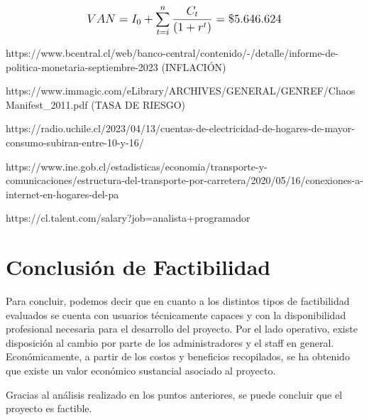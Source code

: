 \[
\mathlarger{
	{VAN} = I_0 + \sum\limits_{t=i}^{n}\frac{C_t}{\left(1+r^t\right)} = \$5.646.624
}
\]

https://www.bcentral.cl/web/banco-central/contenido/-/detalle/informe-de-politica-monetaria-septiembre-2023 (INFLACIÓN)

https://www.immagic.com/eLibrary/ARCHIVES/GENERAL/GENREF/ChaosManifest\_2011.pdf (TASA DE RIESGO)

https://radio.uchile.cl/2023/04/13/cuentas-de-electricidad-de-hogares-de-mayor-consumo-subiran-entre-10-y-16/

https://www.ine.gob.cl/estadisticas/economia/transporte-y-comunicaciones/estructura-del-transporte-por-carretera/2020/05/16/conexiones-a-internet-en-hogares-del-pa%

https://cl.talent.com/salary?job=analista+programador

\section{Conclusión de Factibilidad}
Para concluir, podemos decir que en cuanto a los distintos tipos de factibilidad evaluados se cuenta con usuarios técnicamente capaces y con la disponibilidad profesional necesaria para el desarrollo del proyecto. Por el lado operativo, existe disposición al cambio por parte de los administradores y el staff en general. Económicamente, a partir de los costos y beneficios recopilados, se ha obtenido que existe un valor económico sustancial asociado al proyecto.

Gracias al análisis realizado en los puntos anteriores, se puede concluir que el proyecto es factible.
